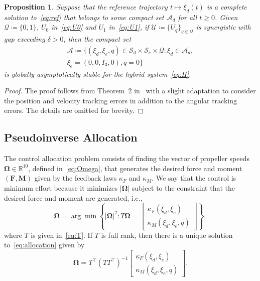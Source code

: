 \documentclass[journal]{IEEEtran}
\newtheorem{proposition}{Proposition}
\newcommand{\norm}[1]{\left| #1 \right|}
\newcommand{\tp}{^\top}
\newcommand{\eye}[1]{I_{#1}}
\begin{document}
\begin{proposition}
  Suppose that the reference trajectory $t\mapsto\xi_d(t)$ is a complete solution to~\eqref{eq:ref} that belongs to some compact set $\mathcal{A}_d$ for all $t\geq 0$. Given $\mathcal{Q}\coloneqq\{0,1\}$, $U_0$ in~\eqref{eq:U0} and $U_1$ in~\eqref{eq:U1}, if $\mathscr{U}\coloneqq\{U_q\}_{q\in\mathcal{Q}}$ is synergistic with gap exceeding $\delta>0$, then the compact set 
  \begin{multline*}
  \mathcal{A}\coloneqq\{(\xi_d,\xi_e,q)\in\mathcal{S}_d\times\mathcal{S}_e\times\mathcal{Q}: \xi_d\in\mathcal{A}_d,\\ \xi_e=(0,0,\eye{3},0),q=0\}
  \end{multline*}
  is globally asymptotically stable for the hybrid system~\eqref{eq:H}.
\end{proposition}

\begin{proof}
  The proof follows from Theorem~2 in~\cite{mayhew_synergistic_2013} with a slight adaptation to consider the position and velocity tracking errors in addition to the angular tracking errors. The details are omitted for brevity.
\end{proof}

\subsection{Pseudoinverse Allocation}
The control allocation problem consists of finding the vector of propeller speeds $\bm{\Omega}\in\mathbb{R}^{10}$, defined in~\eqref{eq:Omega}, that generates the desired force and moment $(\bm{F},\bm{M})$ given by the feedback laws $\kappa_F$ and $\kappa_M$. We say that the control is minimum effort because it minimizes $\norm{\bm{\Omega}}$ subject to the constraint that the desired force and moment are generated, i.e.,
\begin{equation}\label{eq:allocation}
\bm{\Omega}=\arg\min\left\{\norm{\bm{\Omega}}^2: T\bm{\Omega} = \begin{bmatrix} \kappa_F(\xi_d,\xi_e)\\ \kappa_M(\xi_d,\xi_e,q) \end{bmatrix}\right\},
\end{equation}
where $T$ is given in~\eqref{eq:T}. If $T$ is full rank, then there is a unique solution to~\eqref{eq:allocation} given by
\begin{equation}
\bm{\Omega} = T\tp\left(TT\tp\right)^{-1}\begin{bmatrix} \kappa_F(\xi_d,\xi_e)\\ \kappa_M(\xi_d,\xi_e,q) \end{bmatrix}.
\end{equation}
\end{document}
